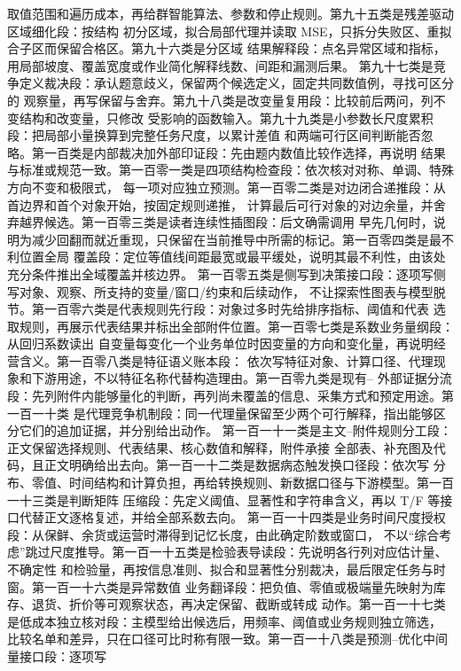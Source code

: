 \documentclass[UTF8,a4paper,12pt]{ctexart}
\begin{document}
取值范围和遍历成本，再给群智能算法、参数和停止规则。第九十五类是残差驱动区域细化段：按结构
初分区域，拟合局部代理并读取 MSE，只拆分失败区、重拟合子区而保留合格区。第九十六类是分区域
结果解释段：点名异常区域和指标，用局部坡度、覆盖宽度或作业简化解释线数、间距和漏测后果。
第九十七类是竞争定义裁决段：承认题意歧义，保留两个候选定义，固定共同数值例，寻找可区分的
观察量，再写保留与舍弃。第九十八类是改变量复用段：比较前后两问，列不变结构和改变量，只修改
受影响的函数输入。第九十九类是小参数长尺度累积段：把局部小量换算到完整任务尺度，以累计差值
和两端可行区间判断能否忽略。第一百类是内部裁决加外部印证段：先由题内数值比较作选择，再说明
结果与标准或规范一致。第一百零一类是四项结构检查段：依次核对对称、单调、特殊方向不变和极限式，
每一项对应独立预测。第一百零二类是对边闭合递推段：从首边界和首个对象开始，按固定规则递推，
计算最后可行对象的对边余量，并舍弃越界候选。第一百零三类是读者连续性插图段：后文确需调用
早先几何时，说明为减少回翻而就近重现，只保留在当前推导中所需的标记。第一百零四类是最不利位置全局
覆盖段：定位等值线间距最宽或最平缓处，说明其最不利性，由该处充分条件推出全域覆盖并核边界。
第一百零五类是侧写到决策接口段：逐项写侧写对象、观察、所支持的变量/窗口/约束和后续动作，
不让探索性图表与模型脱节。第一百零六类是代表规则先行段：对象过多时先给排序指标、阈值和代表
选取规则，再展示代表结果并标出全部附件位置。第一百零七类是系数业务量纲段：从回归系数读出
自变量每变化一个业务单位时因变量的方向和变化量，再说明经营含义。第一百零八类是特征语义账本段：
依次写特征对象、计算口径、代理现象和下游用途，不以特征名称代替构造理由。第一百零九类是现有--
外部证据分流段：先列附件内能够量化的判断，再列尚未覆盖的信息、采集方式和预定用途。第一百一十类
是代理竞争机制段：同一代理量保留至少两个可行解释，指出能够区分它们的追加证据，并分别给出动作。
第一百一十一类是主文--附件规则分工段：正文保留选择规则、代表结果、核心数值和解释，附件承接
全部表、补充图及代码，且正文明确给出去向。第一百一十二类是数据病态触发换口径段：依次写
分布、零值、时间结构和计算负担，再给转换规则、新数据口径与下游模型。第一百一十三类是判断矩阵
压缩段：先定义阈值、显著性和字符串含义，再以 T/F 等接口代替正文逐格复述，并给全部系数去向。
第一百一十四类是业务时间尺度授权段：从保鲜、余货或运营时滞得到记忆长度，由此确定阶数或窗口，
不以“综合考虑”跳过尺度推导。第一百一十五类是检验表导读段：先说明各行列对应估计量、不确定性
和检验量，再按信息准则、拟合和显著性分别裁决，最后限定任务与时窗。第一百一十六类是异常数值
业务翻译段：把负值、零值或极端量先映射为库存、退货、折价等可观察状态，再决定保留、截断或转成
动作。第一百一十七类是低成本独立核对段：主模型给出候选后，用频率、阈值或业务规则独立筛选，
比较名单和差异，只在口径可比时称有限一致。第一百一十八类是预测--优化中间量接口段：逐项写
\end{document}

